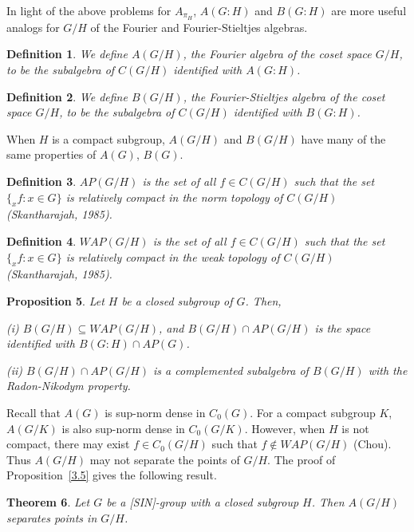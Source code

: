 \documentclass[landscape]{slides}
\newtheorem{defn}{Definition}
\newtheorem{theorem}[defn]{Theorem}
\newtheorem{prop}[defn]{Proposition}
\begin{document}
\begin{slide}
In light of the above problems for $A_{\pi_H}$, $A(G:H)$ and $B(G:H)$ are more useful analogs for $G/H$ of the
Fourier and  Fourier-Stieltjes algebras.

\begin{defn}
We define $A(G/H)$, the Fourier algebra of the coset space $G/H$, to be the subalgebra
of $C(G/H)$ identified with $A(G:H)$.
\end{defn}

\begin{defn}
We define $B(G/H)$, the Fourier-Stieltjes algebra of the coset space $G/H$, to be
the subalgebra of $C(G/H)$ identified with $B(G:H)$.
\end{defn}

When $H$ is a compact subgroup, $A(G/H)$ and $B(G/H)$ have many of the same properties
of $A(G)$, $B(G)$.
\end{slide}

\begin{slide}
\begin{defn}
$AP(G/H)$ is the set of all $f\in C(G/H)$ such that the set $\{ _x f: x\in G\}$ is
relatively compact in the norm topology of $C(G/H)$ (Skantharajah, 1985).
\end{defn}

\begin{defn}
$WAP(G/H)$ is the set of all $f\in C(G/H)$ such that the set $\{ _x f: x\in G\}$ is
relatively compact in the weak topology of $C(G/H)$ (Skantharajah, 1985).
\end{defn}

\begin{prop}
Let $H$ be a closed subgroup of $G$.  Then,
\begin{list}{}{\topsep -4pt \itemsep -4pt}
\item[(i)] $B(G/H)\subseteq WAP(G/H)$, and $B(G/H)\cap AP(G/H)$ is the space identified with
$B(G:H)\cap AP(G)$.
\item[(ii)] $B(G/H)\cap AP(G/H)$ is a complemented subalgebra of $B(G/H)$ with the Radon-Nikodym
property.
\end{list}
\end{prop}
\end{slide}

\begin{slide}
Recall that $A(G)$ is sup-norm dense in $C_0 (G)$.  For a compact subgroup $K$,
$A(G/K)$ is also sup-norm dense in $C_0 (G/K)$.  However, when $H$ is not compact,
there may exist $f\in C_0 (G/H)$ such that $f\not\in WAP(G/H)$ (Chou).  Thus $A(G/H)$ may
not separate the points of $G/H$.  The proof of Proposition~\ref{3.5} gives the following
result.
\begin{theorem}
Let $G$ be a [SIN]-group with a closed subgroup $H$.  Then $A(G/H)$ separates points in $G/H$.
\end{theorem}
\end{slide}
\end{document}
